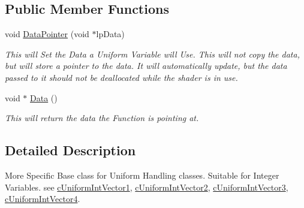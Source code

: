 \subsection*{Public Member Functions}
\begin{DoxyCompactItemize}
\item 
\hypertarget{classc_int_uniform_store_a1a55824498ebea1af11f4e89c8868e77}{
void \hyperlink{classc_int_uniform_store_a1a55824498ebea1af11f4e89c8868e77}{DataPointer} (void $\ast$lpData)}
\label{classc_int_uniform_store_a1a55824498ebea1af11f4e89c8868e77}

\begin{DoxyCompactList}\small\item\em This will Set the Data a Uniform Variable will Use. This will not copy the data, but will store a pointer to the data. It will automatically update, but the data passed to it should not be deallocated while the shader is in use. \end{DoxyCompactList}\item 
\hypertarget{classc_int_uniform_store_aac23b6807a6fec5f9f723cedd8b3457b}{
void $\ast$ \hyperlink{classc_int_uniform_store_aac23b6807a6fec5f9f723cedd8b3457b}{Data} ()}
\label{classc_int_uniform_store_aac23b6807a6fec5f9f723cedd8b3457b}

\begin{DoxyCompactList}\small\item\em This will return the data the Function is pointing at. \end{DoxyCompactList}\end{DoxyCompactItemize}


\subsection{Detailed Description}
More Specific Base class for Uniform Handling classes. Suitable for Integer Variables. see \hyperlink{classc_uniform_int_vector1}{cUniformIntVector1}, \hyperlink{classc_uniform_int_vector2}{cUniformIntVector2}, \hyperlink{classc_uniform_int_vector3}{cUniformIntVector3}, \hyperlink{classc_uniform_int_vector4}{cUniformIntVector4}. 